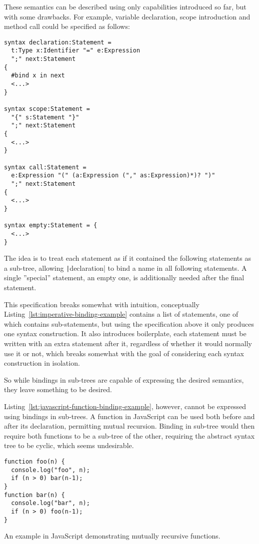 \documentclass{kththesis}
\begin{document}
These semantics can be described using only capabilities introduced so far, but with some drawbacks. For example, variable declaration, scope introduction and method call could be specified as follows:

\begin{verbatim}
syntax declaration:Statement =
  t:Type x:Identifier "=" e:Expression
  ";" next:Statement
{
  #bind x in next
  <...>
}

syntax scope:Statement =
  "{" s:Statement "}"
  ";" next:Statement
{
  <...>
}

syntax call:Statement =
  e:Expression "(" (a:Expression ("," as:Expression)*)? ")"
  ";" next:Statement
{
  <...>
}

syntax empty:Statement = {
  <...>
}
\end{verbatim}

The idea is to treat each statement as if it contained the following statements as a sub-tree, allowing \texttt|declaration| to bind a name in all following statements. A single ''special'' statement, an empty one, is additionally needed after the final statement.

This specification breaks somewhat with intuition, conceptually Listing~\ref{lst:imperative-binding-example} contains a list of statements, one of which contains sub-statements, but using the specification above it only produces one syntax construction. It also introduces boilerplate, each statement must be written with an extra statement after it, regardless of whether it would normally use it or not, which breaks somewhat with the goal of considering each syntax construction in isolation.

So while bindings in sub-trees are capable of expressing the desired semantics, they leave something to be desired.

Listing~\ref{lst:javascript-function-binding-example}, however, cannot be expressed using bindings in sub-trees. A function in JavaScript can be used both before and after its declaration, permitting mutual recursion. Binding in sub-tree would then require both functions to be a sub-tree of the other, requiring the abstract syntax tree to be cyclic, which seems undesirable.

\begin{listing}
\begin{verbatim}
function foo(n) {
  console.log("foo", n);
  if (n > 0) bar(n-1);
}
function bar(n) {
  console.log("bar", n);
  if (n > 0) foo(n-1);
}
\end{verbatim}
\caption{An example in JavaScript demonstrating mutually recursive functions.}
\label{lst:javascript-function-binding-example}
\end{listing}
\end{document}
